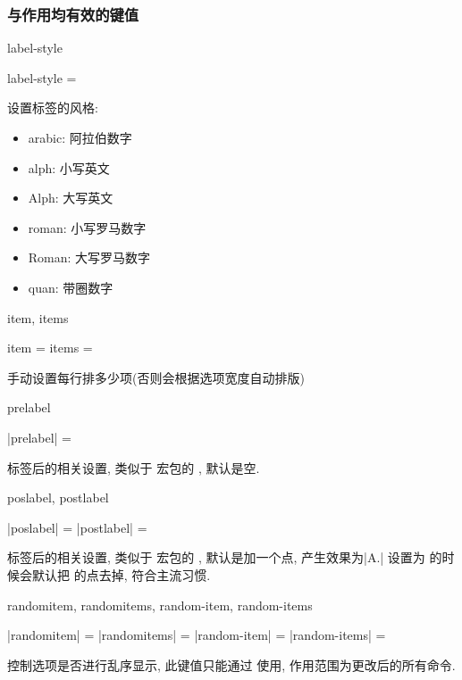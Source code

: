 \documentclass{l3doc}
\begin{document}
\begin{documentation}
\subsubsection{与作用均有效的键值}
\begin{function}{label-style}
  \begin{syntax}
    label-style =  
  \end{syntax}
  设置标签的风格: 
  \begin{itemize}
    \item arabic: 阿拉伯数字
    \item alph: 小写英文
    \item Alph: 大写英文
    \item roman: 小写罗马数字
    \item Roman: 大写罗马数字
    \item quan: 带圈数字
  \end{itemize}
\end{function}


\begin{function}{item, items}
  \begin{syntax}
    item = 
    items = 
  \end{syntax}
  手动设置每行排多少项(否则会根据选项宽度自动排版)
\end{function}

\begin{function}{prelabel}
  \begin{syntax}
    |prelabel| =  \init{{}}
  \end{syntax}
  标签后的相关设置, 类似于  宏包的 , 默认是空. 
\end{function}

\begin{function}[updated = 2021-12-24]{poslabel, postlabel}
  \begin{syntax}
    |poslabel| =  
    |postlabel| =  
  \end{syntax}
  标签后的相关设置, 类似于  宏包的 , 默认是加一个点, 产生效果为|A.|
   设置为  的时候会默认把 的点去掉, 符合主流习惯.
\end{function}

\begin{function}[added = 2021-12-25]{randomitem, randomitems, random-item, random-items}
  \begin{syntax}
    |randomitem| =  
    |randomitems| =  
    |random-item| =  
    |random-items| =  
  \end{syntax}
  控制选项是否进行乱序显示, 此键值只能通过  使用, 作用范围为更改后的所有命令.
\end{function}




\end{documentation}
\end{document}
